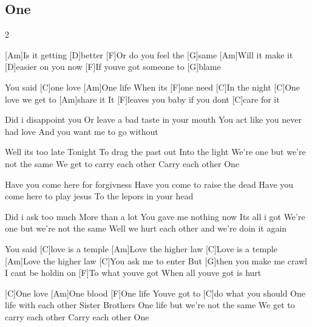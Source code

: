 \subsection*{One   }
\begin{guitar}
  \begin{multicols}2{}

[Am]Is it getting [D]better
[F]Or do you feel the [G]same
[Am]Will it make it [D]easier on you now
[F]If youve got someone to [G]blame


You said [C]one love
[Am]One life
When its [F]one need
[C]In the night
[C]One love we get to [Am]share it
It [F]leaves you baby if you dont [C]care for it


Did i disappoint you
Or leave a bad taste in your mouth
You act like you never had love
And you want me to go without


Well its too late
Tonight
To drag the past out
Into the light
We're one but we're not the same
We get to carry each other
Carry each other
One

Have you come here for forgivness
Have you come to raise the dead
Have you come here to play jesus
To the lepors in your head

Did i ask too much
More than a lot
You gave me nothing now
Its all i got
We're one but we're not the same
Well we hurt each other and we're doin it again

\columnbreak

You said [C]love is a temple
[Am]Love the higher law
[C]Love is a temple
[Am]Love the higher law
[C]You ask me to enter
But [G]then you make me crawl
I cant be holdin on
[F]To what youve got
When all youve got is hurt


[C]One love
[Am]One blood
[F]One life
Youve got to [C]do what you should
One life with each other
Sister
Brothers
One life but we're not the same
We get to carry each other
Carry each other
One

\end{multicols}
\end{guitar}
